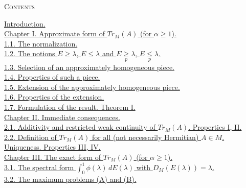 \documentclass[twoside,leqno]{article}
\newcommand{\TrM}{Tr_M}
\newcommand{\DM}{D_{M}}
\begin{document}
\begin{center}
  \hypertarget{contents}{}\textsc{Contents}
\end{center}
\noindent\hyperlink{sec:introduction}{Introduction.}\\
\hyperlink{chap:I}{Chapter I. Approximate form of $\TrM(A)$ (for $\alpha\geq1$).}\\
\hspace*{2em}\hyperlink{sec:1.1}{1.1. The normalization.}\\
\hspace*{2em}\hyperlink{sec:1.2}{1.2. The notions $E\geq\lambda$, $E\leq\lambda$ and
$E\mathrel{\underset p\geq}\lambda$, $E\mathrel{\underset p\leq}\lambda$.}\\
\hspace*{2em}\hyperlink{sec:1.3}{1.3. Selection of an approximately homogeneous piece.}\\
\hspace*{2em}\hyperlink{sec:1.4}{1.4. Properties of such a piece.}\\
\hspace*{2em}\hyperlink{sec:1.5}{1.5. Extension of the approximately homogeneous piece.}\\
\hspace*{2em}\hyperlink{sec:1.6}{1.6. Properties of the extension.}\\
\hspace*{2em}\hyperlink{sec:1.7}{1.7. Formulation of the result. Theorem I.}\\
\hyperlink{chap:II}{Chapter II. Immediate consequences.}\\
\hspace*{2em}\hyperlink{sec:2.1}{2.1. Additivity and restricted weak continuity of $\TrM(A)$. Properties I, II.}\\
\hspace*{2em}\hyperlink{sec:2.2}{2.2. Definition of $\TrM(A)$ for all (not necessarily Hermitian) $A\in M$.}\\
\hspace*{4em}\hyperlink{sec:2.2}{Uniqueness. Properties III, IV.}\\
\hyperlink{chap:III}{Chapter III. The exact form of $\TrM(A)$ (for $\alpha\geq1$).}\\
\hspace*{2em}\hyperlink{sec:3.1}{3.1. The spectral form $\int_0^1\phi(\lambda)\,dE(\lambda)$ with $\DM(E(\lambda))=\lambda$.}\\
\hspace*{2em}\hyperlink{sec:3.2}{3.2. The maximum problems (A) and (B).}\\
\end{document}
